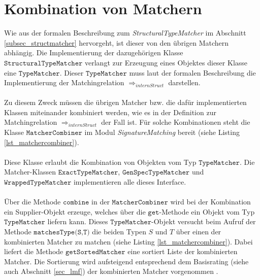 \chapter{Kombination von Matchern}\label{app_matchercombination}
Wie aus der formalen Beschreibung zum \emph{StructuralTypeMatcher} im Abschnitt \ref{subsec_structmatcher} hervorgeht, ist dieser von den übrigen Matchern abhängig. Die Implementierung der dazugehörigen Klasse $\texttt{StructuralTypeMatcher}$ verlangt zur Erzeugung eines Objektes dieser Klasse eine $\texttt{TypeMatcher}$. Dieser $\texttt{TypeMatcher}$ muss laut der formalen Beschreibung die Implementierung der Matchingrelation $\Rightarrow_{internStruct}$ darstellen.
\\\\
Zu diesem Zweck müssen die übrigen Matcher bzw. die dafür implementierten Klassen miteinander kombiniert werden, wie es in der Definition zur Matchingrelation $\Rightarrow_{internStruct}$ der Fall ist. Für solche Kombinationen steht die Klasse $\texttt{MatcherCombiner}$ im Modul \emph{SignatureMatching} bereit (siehe Listing \ref{lst_matchercombiner}).
\\\\
Diese Klasse erlaubt die Kombination von Objekten vom Typ $\texttt{TypeMatcher}$. 
Die Matcher-Klassen $\texttt{ExactTypeMatcher}$, $\texttt{GenSpecTypeMatcher}$ und $\texttt{WrappedTypeMatcher}$ implementieren alle dieses Interface. 
\\\\
Über die Methode $\texttt{combine}$ in der $\texttt{MatcherCombiner}$ wird bei der Kombination ein Supplier-Objekt erzeuge, welches über die $\texttt{get}$-Methode ein Objekt vom Typ $\texttt{TypeMatcher}$ liefern kann. Dieses $\texttt{TypeMatcher}$-Objekt versucht beim Aufruf der Methode $\texttt{matchesType(S,T)}$ die beiden Typen $S$ und $T$ über einen der kombinierten Matcher zu matchen (siehe  Listing \ref{lst_matchercombiner}). Dabei liefert die Methode $\texttt{getSortedMatcher}$ eine sortiert Liste der kombinierten Matcher. Die Sortierung wird aufsteigend entsprechend dem Basisrating (siehe auch Abschnitt \ref{sec_lmf}) der kombinierten Matcher vorgenommen .
